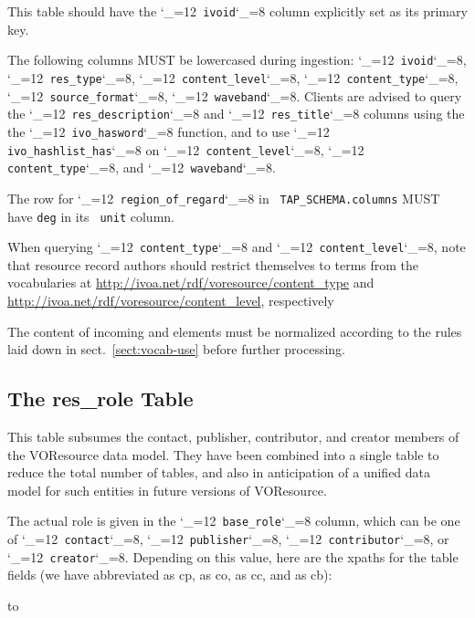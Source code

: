 \documentclass[11pt,a4paper]{ivoa}
\makeatletter
\def\rtent#1{\texttt{\color{rtcolor}\verb|#1|}}
\def\makeunderscoreletter{\catcode`\_=12}
\def\makeunderscoresubscript{\catcode`\_=8}
\def\rtent{\makeunderscoreletter\relax\rt@nt}
\def\rt@nt#1{\texttt{\color{rtcolor} #1}\makeunderscoresubscript{}}
\newcommand{\tapent}[1]{\texttt{\color{tapcolor} #1}}
\makeatother
\begin{document}


This table should have the \rtent{ivoid} column explicitly set
as its primary key.

The following columns MUST be lowercased during ingestion:
\rtent{ivoid}, \rtent{res_type}, \rtent{content_level},
\rtent{content_type}, \rtent{source_format},
\rtent{waveband}.
Clients are advised to query the \rtent{res_description} and
\rtent{res_title}  columns
using the the \rtent{ivo_hasword} function, and to use
\rtent{ivo_hashlist_has} on \rtent{content_level},
\rtent{content_type}, and
\rtent{waveband}.

The row for \rtent{region_of_regard} in
\tapent{TAP\_SCHEMA.columns} MUST have \texttt{deg} in its
\tapent{unit} column.

When querying \rtent{content_type} and \rtent{content_level},
note that resource record authors should restrict themselves to terms
from the vocabularies at
\url{http://ivoa.net/rdf/voresource/content_type} and
\url{http://ivoa.net/rdf/voresource/content_level}, respectively

The content of incoming  and 
elements must be normalized according to the rules laid down in
sect.~\ref{sect:vocab-use} before further processing.


\subsection{The res\_role Table}

\label{table_res_role}

This table subsumes the contact, publisher, contributor,
and creator members of the
VOResource data model.  They have been combined into a single table to
reduce the total number of tables, and also in anticipation of a unified
data model for such entities in future versions of VOResource.

The actual role is given in the \rtent{base_role} column, which
can be one of \rtent{contact}, \rtent{publisher}, \rtent{contributor}, or
\rtent{creator}.  Depending on this value, here are the xpaths
for the table fields (we have abbreviated
as cp,  as co, 
as cc,
and  as cb):

\vspace{5pt}
\hbox to
\vskip5pt
\end{document}
